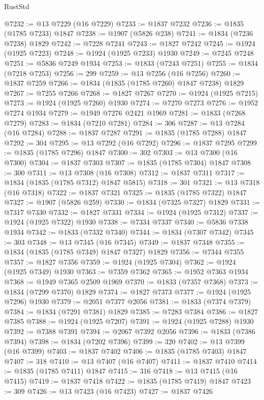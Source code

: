 \begin{lexlean}{RustStd}
\begin{coremodule}
@7232 := @13 @7229 (@16 @7229)
@7233 := @1837 @7232
@7236 := @1835 (@1785 @7233) @1847
@7238 := @1907 (@5826 @238)
@7241 := @1834 (@7236 @7238) @1829
@7242 := @7228 @7241
@7243 := @1827 @7242
@7245 := @1924 (@1925 @7223)
@7248 := @1924 (@1925 @7233) @1930
@7249 := @7245 @7248
@7251 := @5836 @7249 @1934
@7253 := @1833 (@7243 @7251)
@7255 := @1834 (@7218 @7253)
@7256 := 299
@7259 := @13 @7256 (@16 @7256)
@7260 := @1837 @7259
@7266 := @1834 (@1835 (@1785 @7260) @1847 @7238) @1829
@7267 := @7255 @7266
@7268 := @1827 @7267
@7270 := @1924 (@1925 @7215)
@7273 := @1924 (@1925 @7260) @1930
@7274 := @7270 @7273
@7276 := @1952 @7274 @1934
@7279 := @1949 @7276 @2421 @1969
@7281 := @1833 (@7268 @7279)
@7283 := @1834 (@7210 @7281)
@7284 := 306
@7287 := @13 @7284 (@16 @7284)
@7288 := @1837 @7287
@7291 := @1835 (@1785 @7288) @1847
@7292 := 304
@7295 := @13 @7292 (@16 @7292)
@7296 := @1837 @7295
@7299 := @1835 (@1785 @7296) @1847
@7300 := 302
@7303 := @13 @7300 (@16 @7300)
@7304 := @1837 @7303
@7307 := @1835 (@1785 @7304) @1847
@7308 := 300
@7311 := @13 @7308 (@16 @7308)
@7312 := @1837 @7311
@7317 := @1834 (@1835 (@1785 @7312) @1847 @5815)
@7318 := 301
@7321 := @13 @7318 (@16 @7318)
@7322 := @1837 @7321
@7325 := @1835 (@1785 @7322) @1847
@7327 := @1907 (@5826 @259)
@7330 := @1834 (@7325 @7327) @1829
@7331 := @7317 @7330
@7332 := @1827 @7331
@7334 := @1924 (@1925 @7312)
@7337 := @1924 (@1925 @7322) @1930
@7338 := @7334 @7337
@7340 := @5836 @7338 @1934
@7342 := @1833 (@7332 @7340)
@7344 := @1834 (@7307 @7342)
@7345 := 303
@7348 := @13 @7345 (@16 @7345)
@7349 := @1837 @7348
@7355 := @1834 (@1835 (@1785 @7349) @1847 @7327) @1829
@7356 := @7344 @7355
@7357 := @1827 @7356
@7359 := @1924 (@1925 @7304)
@7362 := @1924 (@1925 @7349) @1930
@7363 := @7359 @7362
@7365 := @1952 @7363 @1934
@7368 := @1949 @7365 @2509 @1969
@7370 := @1833 (@7357 @7368)
@7373 := @1834 (@7299 @7370) @1829
@7374 := @1827 @7373
@7377 := @1924 (@1925 @7296) @1930
@7379 := @2051 @7377 @2056
@7381 := @1833 (@7374 @7379)
@7384 := @1834 (@7291 @7381) @1829
@7385 := @7283 @7384
@7386 := @1827 @7385
@7388 := @1924 (@1925 @7207)
@7391 := @1924 (@1925 @7288) @1930
@7392 := @7388 @7391
@7394 := @2067 @7392 @2056
@7396 := @1833 (@7386 @7394)
@7398 := @1834 (@7202 @7396)
@7399 := 320
@7402 := @13 @7399 (@16 @7399)
@7403 := @1837 @7402
@7406 := @1835 (@1785 @7403) @1847
@7407 := 318
@7410 := @13 @7407 (@16 @7407)
@7411 := @1837 @7410
@7414 := @1835 (@1785 @7411) @1847
@7415 := 316
@7418 := @13 @7415 (@16 @7415)
@7419 := @1837 @7418
@7422 := @1835 (@1785 @7419) @1847
@7423 := 309
@7426 := @13 @7423 (@16 @7423)
@7427 := @1837 @7426

\end{coremodule}
\end{lexlean}
